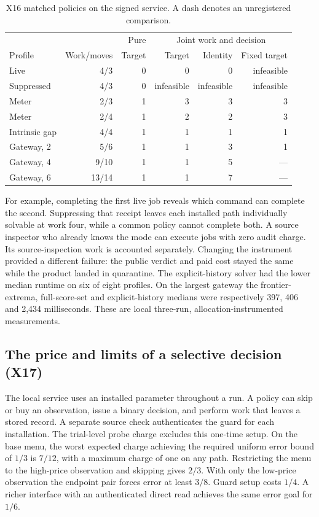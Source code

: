 \begin{table}[htbp]\centering\small
\caption{X16 matched policies on the signed service. A dash denotes an unregistered comparison.}\label{tab:x16reader}
\setlength{\tabcolsep}{3pt}\begin{tabular}{lrrrrr}\toprule
& & Pure & \multicolumn{3}{c}{Joint work and decision}\\
Profile & Work/moves & Target & Target & Identity & Fixed target\\\midrule
Live & 4/3 & 0 & 0 & 0 & infeasible\\
Suppressed & 4/3 & 0 & infeasible & infeasible & infeasible\\
Meter & 2/3 & 1 & 3 & 3 & 3\\
Meter & 2/4 & 1 & 2 & 2 & 3\\
Intrinsic gap & 4/4 & 1 & 1 & 1 & 1\\
Gateway, 2 & 5/6 & 1 & 1 & 3 & 1\\
Gateway, 4 & 9/10 & 1 & 1 & 5 & ---\\
Gateway, 6 & 13/14 & 1 & 1 & 7 & ---\\\bottomrule
\end{tabular}\end{table}

For example, completing the first live job reveals which command can complete the second. Suppressing that receipt leaves each installed path individually solvable at work four, while a common policy cannot complete both. A source inspector who already knows the mode can execute jobs with zero audit charge. Its source-inspection work is accounted separately. Changing the instrument provided a different failure: the public verdict and paid cost stayed the same while the product landed in quarantine. The explicit-history solver had the lower median runtime on six of eight profiles. On the largest gateway the frontier-extrema, full-score-set and explicit-history medians were respectively 397, 406 and 2,434 milliseconds. These are local three-run, allocation-instrumented measurements.

\subsection{The price and limits of a selective decision (X17)}
The local service uses an installed parameter throughout a run. A policy can skip or buy an observation, issue a binary decision, and perform work that leaves a stored record. A separate source check authenticates the guard for each installation. The trial-level probe charge excludes this one-time setup. On the base menu, the worst expected charge achieving the required uniform error bound of $1/3$ is $7/12$, with a maximum charge of one on any path. Restricting the menu to the high-price observation and skipping gives $2/3$. With only the low-price observation the endpoint pair forces error at least $3/8$. Guard setup costs $1/4$. A richer interface with an authenticated direct read achieves the same error goal for $1/6$.


